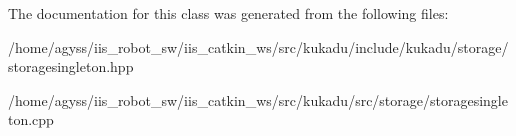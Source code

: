 The documentation for this class was generated from the following files\+:\begin{DoxyCompactItemize}
\item 
/home/agyss/iis\+\_\+robot\+\_\+sw/iis\+\_\+catkin\+\_\+ws/src/kukadu/include/kukadu/storage/storagesingleton.\+hpp\item 
/home/agyss/iis\+\_\+robot\+\_\+sw/iis\+\_\+catkin\+\_\+ws/src/kukadu/src/storage/storagesingleton.\+cpp\end{DoxyCompactItemize}
